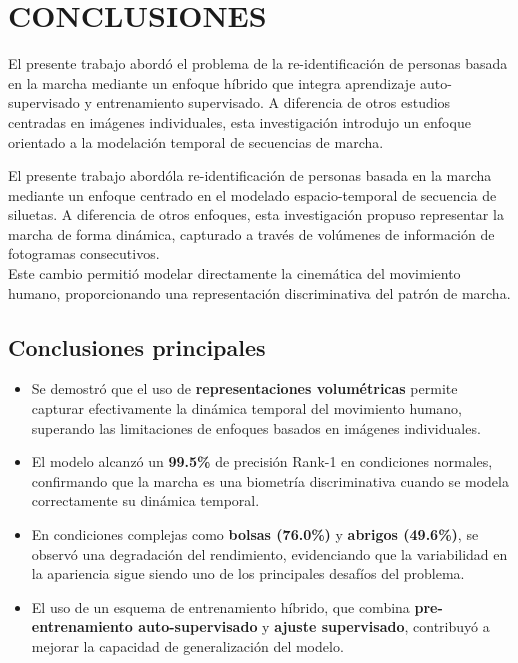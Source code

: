 \chapter{CONCLUSIONES}

El presente trabajo abordó el problema de la re-identificación de personas basada en la marcha mediante un enfoque híbrido que integra aprendizaje auto-supervisado y entrenamiento supervisado. A diferencia de otros estudios centradas en imágenes individuales, esta investigación introdujo un enfoque orientado a la modelación temporal de secuencias de marcha.

El presente trabajo abordóla re-identificación de personas basada en la marcha mediante un enfoque centrado en el modelado espacio-temporal de secuencia de siluetas. A diferencia de otros enfoques, esta investigación propuso representar la marcha de forma dinámica, capturado a través de volúmenes de información de fotogramas consecutivos. \\
Este cambio permitió modelar directamente la cinemática del movimiento humano, proporcionando una representación discriminativa del patrón de marcha.

\section{Conclusiones principales}

\begin{itemize}
    \item Se demostró que el uso de \textbf{representaciones volumétricas} permite capturar efectivamente la dinámica temporal del movimiento humano, superando las limitaciones de enfoques basados en imágenes individuales.

    \item El modelo alcanzó un \textbf{99.5\%} de precisión Rank-1 en condiciones normales, confirmando que la marcha es una biometría discriminativa cuando se modela correctamente su dinámica temporal.

    \item En condiciones complejas como \textbf{bolsas (76.0\%)} y \textbf{abrigos (49.6\%)}, se observó una degradación del rendimiento, evidenciando que la variabilidad en la apariencia sigue siendo uno de los principales desafíos del problema.

    \item El uso de un esquema de entrenamiento híbrido, que combina \textbf{pre-entrenamiento auto-supervisado} y \textbf{ajuste supervisado}, contribuyó a mejorar la capacidad de generalización del modelo.
\end{itemize}

